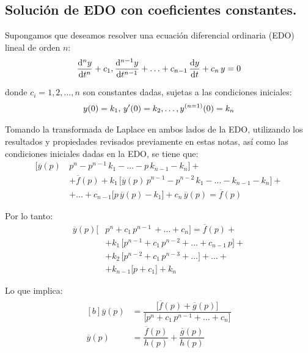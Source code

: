 \subsection{Solución de EDO con coeficientes constantes.}

Supongamos que deseamos resolver una ecuación diferencial ordinaria (EDO) lineal de orden $n$:
\begin{align}
\dv[n]{y}{t} + c_{1} , \dv[n-1]{y}{t} + \ldots + c_{n-1} \, \dv{y}{t} + c_{n} \, y = 0
\label{eq:ecuacion_04_54}
\end{align}

donde $c_{i} = 1, 2, \ldots, n$ son constantes dadas, sujetas a las condiciones iniciales:
\begin{align*}
y(0) = k_{1}, \, {y}^{\prime}(0) = k_{2} , \ldots, {y}^{(n=1)}(0)= k_{n}
\end{align*}

Tomando la transformada de Laplace en ambos lados de la EDO, utilizando los resultados y propiedades revisados previamente en estas notas, así como las condiciones iniciales dadas en la EDO, se tiene que:
\begin{align*}
\big[\overline{y}(p) \, &p^{n} - p^{n-1} \, k_{1} - \ldots - p \, k_{n-1} - k_{n} \big] + \\[0.5em] &+ \overline{f}(p) + k_{1} \, \big[\overline{y}(p) \, p^{n-1} - p^{n-2} \, k_{1} - \ldots - k_{n-1} - k_{n} \big] + \\[0.5em]
&+ \ldots + c_{n-1} \big[p \, \overline{y}(p) - k_{1} \big] + c_{n} \, \overline{y}(p) = \overline{f}(p)
\end{align*}

Por lo tanto:
\begin{align*}
\overline{y}(p) \big[&p^{n} + c_{1} \, p^{n-1} \, + \ldots + c_{n} \big] = \overline{f}(p) + \\[0.5em]
&+ k_{1} \, \big[p^{n-1} + c_{1} \, p^{n-2} + \ldots + c_{n-1} \, p\big] + \\[0.5em]
&+ k_{2} \, \big[p^{n-2} + c_{1} \, p^{n-3} + \ldots \big] +  \ldots + \\[0.5em]
&+ k_{n-1} \big[p + c_{1} \big] + k_{n}
\end{align*}

Lo que implica:
\begin{align}
\begin{aligned}[b]
\overline{y}(p) &= \dfrac{\big[\overline{f}(p) + \overline{g}(p) \big]}{\big[p^{n}+ c_{1} \, p^{n-1} + \ldots + c_{n}\big]} \\[0.5em]
\overline{y}(p) &= \dfrac{\overline{f}(p)}{h(p)} + \dfrac{\overline{g}(p)}{h(p)}
\end{aligned}
\label{eq:ecuacion_04_55}
\end{align}

